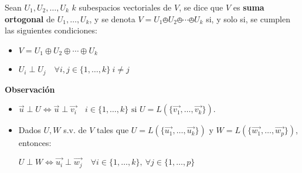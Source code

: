 \documentclass[x11names,table]{report}
\begin{document}
Sean $U_1, U_2,\dots ,U_k$ $k$ subespacios vectoriales de $V$, se dice que $V$ es \textbf{suma ortogonal} de $U_1,\dots ,U_k$, y se denota $V=U_1\obot U_2\obot\cdots\obot U_k$ si, y solo si, se cumplen las siguientes condiciones:
\begin{itemize}
\item $V=U_1\oplus U_2\oplus\cdots\oplus U_k$
\item $U_i\perp U_j \quad\forall i,j\in\{1,\dots ,k\} \ i\not=j$
\end{itemize}

\textbf{Observación}
\begin{itemize}
\item $\vec{u}\perp U\Longleftrightarrow\vec{u}\perp\vec{v_i}\quad i\in\{1,\dots,k\}\text{ si }U=L(\{\vec{v_1},\dots,\vec{v_k}\})$.
\item Dados $U,W$ s.v. de $V$ tales que $U=L(\{\vec{u_1},\dots,\vec{u_k}\})$ y $W=L(\{\vec{w_1},\dots,\vec{w_p}\})$, entonces:

$U\perp W\Longleftrightarrow\vec{u_i}\perp\vec{w_j}\quad\forall i\in\{1,\dots,k\}, \ \forall j\in\{1,\dots,p\}$
\end{itemize}
\end{document}
